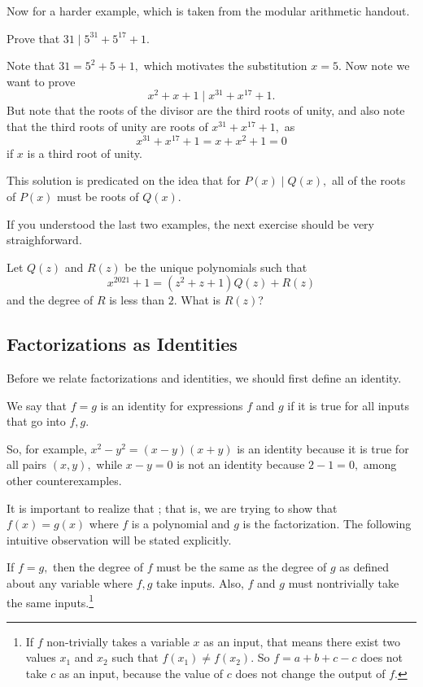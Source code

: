 \documentclass{article}
\begin{document}
Now for a harder example, which is taken from the modular arithmetic handout.

\begin{exam}
Prove that $31\mid 5^{31}+5^{17}+1.$
\end{exam}

\begin{sol}
Note that $31=5^2+5+1,$ which motivates the substitution $x=5.$ Now note we want to prove
\[x^2+x+1\mid x^{31}+x^{17}+1.\]
But note that the roots of the divisor are the third roots of unity, and also note that the third roots of unity are roots of $x^{31}+x^{17}+1,$ as
\[x^{31}+x^{17}+1=x+x^2+1=0\]
if $x$ is a third root of unity.
\end{sol}
This solution is predicated on the idea that for $P(x)\mid Q(x),$ all of the roots of $P(x)$ must be roots of $Q(x).$

If you understood the last two examples, the next exercise should be very straighforward.

\begin{exam}[AMC 12B 2021/20]
Let $Q(z)$ and $R(z)$ be the unique polynomials such that
\[x^{2021}+1=(z^2+z+1)Q(z)+R(z)\]
and the degree of $R$ is less than $2$. What is $R(z)$?
\end{exam}

\subsection{Factorizations as Identities}

Before we relate factorizations and identities, we should first define an identity.

\begin{defi}[Identity]
We say that $f=g$ is an identity for expressions $f$ and $g$ if it is true for all inputs that go into $f,g$.
\end{defi}

So, for example, $x^2-y^2=(x-y)(x+y)$ is an identity because it is true for all pairs $(x,y),$ while $x-y=0$ is not an identity because $2-1=0,$ among other counterexamples.

It is important to realize that ; that is, we are trying to show that $f(x)=g(x)$ where $f$ is a polynomial and $g$ is the factorization. The following intuitive observation will be stated explicitly.

\begin{theo}
If $f=g,$ then the degree of $f$ must be the same as the degree of $g$ as defined about any variable where $f,g$ take inputs. Also, $f$ and $g$ must nontrivially take the same inputs.\footnote{If $f$ non-trivially takes a variable $x$ as an input, that means there exist two values $x_1$ and $x_2$ such that $f(x_1)\neq f(x_2).$ So $f=a+b+c-c$ does not take $c$ as an input, because the value of $c$ does not change the output of $f.$}
\end{theo}
\end{document}
